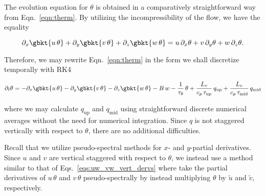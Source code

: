 The evolution equation for $\theta$ is obtained in a comparatively straightforward way from Eqn.~\ref{eqn:therm}. By utilizing the incompressibility of the flow, we have the equality

\begin{equation}
	\partial_x \gbkt{u\,\theta} + \partial_y \gbkt{v\,\theta} + \partial_z \gbkt{w\,\theta} = u\,\partial_x \theta + v\,\partial_y \theta + w\,\partial_z \theta.
\end{equation}

Therefore, we may rewrite Eqn.~\ref{eqn:therm} in the form we shall discretize temporally with RK4

\begin{align}
	\partial_t \theta = -\partial_x \gbkt{u\,\theta} - \partial_y \gbkt{v\,\theta} - \partial_z \gbkt{w\,\theta} - B\,w - \frac{1}{\tau_{\theta}}\,\theta + \frac{L_v}{c_p\,\tau_{\text{up}}}\,q_{\text{up}} + \frac{L_v}{c_p\,\tau_{\text{mid}}}\,q_{\text{mid}}
\end{align}

where we may calculate $q_{\text{up}}$ and $q_{\text{mid}}$ using straightforward discrete numerical averages without the need for numerical integration. Since $q$ is not staggered vertically with respect to $\theta$, there are no additional difficulties.

Recall that we utilize pseudo-spectral methods for $x$- and $y$-partial derivatives. Since $u$ and $v$ are vertical staggered with respect to $\theta$, we instead use a method similar to that of Eqs.~\ref{eqs:uw_vw_vert_dervs} where take the partial derivatives of $u\,\theta$ and $v\,\theta$ pseudo-spectrally by instead multiplying $\theta$ by $\widetilde{u}$ and $\widetilde{v}$, respectively.